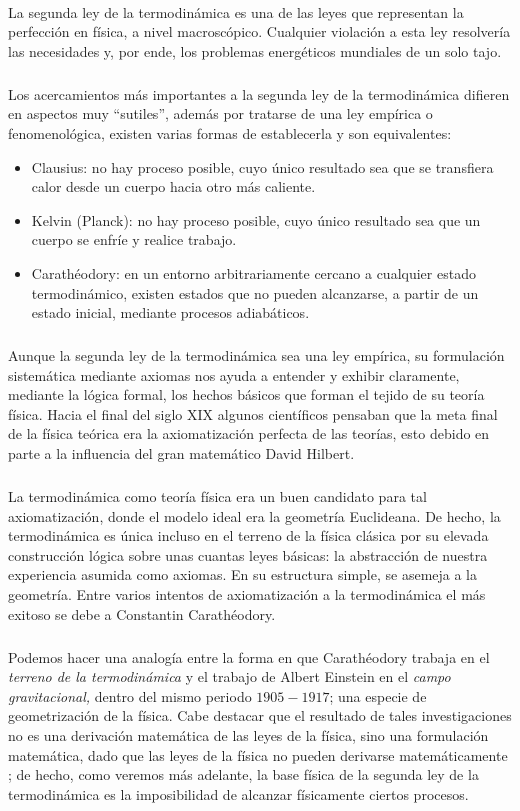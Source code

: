 \documentclass{article}
\theoremstyle{definition} \newtheorem{defi}{Definici\'on}
\theoremstyle{definition} \newtheorem{teo}{Teorema}
\theoremstyle{definition} \newtheorem{cor}{Corolario}
\begin{document}
\paragraph{}
La segunda ley de la termodin\'amica es una de las leyes que representan la perfecci\'on en f\'isica, a nivel macrosc\'opico. Cualquier violaci\'on a esta ley resolver\'ia las necesidades y, por ende, los problemas energ\'eticos mundiales de un solo tajo.
\subparagraph{}
Los acercamientos m\'as importantes a la segunda ley de la termodin\'amica difieren en aspectos muy ``sutiles'', adem\'as por tratarse de una ley emp\'irica o fenomenol\'ogica, existen varias formas de establecerla y son equivalentes:
\begin{itemize}
\item Clausius: no hay proceso posible, cuyo \'unico resultado sea que se transfiera calor desde un cuerpo hacia otro m\'as caliente.
\item Kelvin (Planck): no hay proceso posible, cuyo \'unico resultado sea que un cuerpo se enfr\'ie y realice trabajo.
\item Carath\'eodory: en un entorno arbitrariamente cercano a cualquier estado termodin\'amico, existen estados que no pueden alcanzarse, a partir de un estado inicial, mediante procesos adiab\'aticos.
\end{itemize}
\subparagraph{}
Aunque la segunda ley de la termodin\'amica sea una ley emp\'irica, su formulaci\'on sistem\'atica mediante axiomas nos ayuda a entender y exhibir claramente, mediante la l\'ogica formal, los hechos b\'asicos que forman el tejido de su teor\'ia f\'isica. Hacia el final del siglo XIX algunos cient\'ificos pensaban que la meta final de la f\'isica te\'orica era la axiomatizaci\'on perfecta de las teor\'ias, esto debido en parte a la influencia del gran matem\'atico David Hilbert.
\subparagraph{}
La termodin\'amica como teor\'ia f\'isica era un buen candidato para tal axiomatizaci\'on, donde el modelo ideal era la geometr\'ia Euclideana. De hecho, la termodin\'amica es \'unica incluso en el terreno de la f\'isica cl\'asica por su elevada construcci\'on l\'ogica sobre unas cuantas leyes b\'asicas: la abstracci\'on de nuestra experiencia asumida como axiomas. En su estructura simple, se asemeja a la geometr\'ia. Entre varios intentos de axiomatizaci\'on a la termodin\'amica el m\'as exitoso se debe a Constantin Carath\'eodory.
\subparagraph{}
Podemos hacer una analog\'ia entre la forma en que Carath\'eodory trabaja en el \emph{terreno de la termodin\'amica} y el trabajo de Albert Einstein en el \emph{campo gravitacional,} dentro del mismo periodo $1905-1917$; una especie de geometrizaci\'on de la f\'isica. Cabe destacar que el resultado de tales investigaciones no es una derivaci\'on matem\'atica de las leyes de la f\'isica, sino una formulaci\'on matem\'atica, dado que las leyes de la f\'isica no pueden derivarse matem\'aticamente \cite{LP}; de hecho, como veremos m\'as adelante, la base f\'isica de la segunda ley de la termodin\'amica es la imposibilidad de alcanzar f\'isicamente ciertos procesos.
\end{document}
